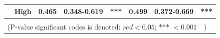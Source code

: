 \documentclass[cancers,article,submit,moreauthors,pdftex]{Definitions/mdpi}
\begin{document}
\begin{table}[!hp]
{\begin{tabular}{|l|l|l|l|l|l|l|l|}
\cline{2-8}
                                        & High                                                                                & 0.465                                                                          & 0.348-0.619                                                                   & \multicolumn{1}{c|}{\textcolor[rgb]{1,0.149,0}{***}}                          & 0.499                                                                          & 0.372-0.669                                                                   & \multicolumn{1}{c|}{\textcolor[rgb]{1,0.149,0}{***}}                           \\ 
\hline
\multicolumn{8}{|l|}{}                                                                                                                                                                                                                                                                                                                                                                                                                                                                                                                                                                                                           \\ 
\hline
\multicolumn{8}{|l|}{(P-value significant codes is denoted: $red<0.05$; *** $<0.001$~~)}                                                                                                                                                                                                                                                                                                                                                                                                                                                                                                                                           \\
\hline
\end{tabular}
}
\label{table:table4}
\end{table}






\end{document}
